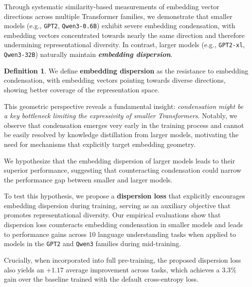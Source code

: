 \documentclass{article}
\theoremstyle{plain}
\theoremstyle{definition}
\newtheorem{definition}[theorem]{Definition}
\theoremstyle{remark}
\begin{document}
Through systematic similarity-based measurements of embedding vector directions across multiple Transformer families, we demonstrate that smaller models (e.g., \texttt{GPT2}, \texttt{Qwen3-0.6B}) exhibit severe embedding condensation, with embedding vectors concentrated towards nearly the same direction and therefore undermining representational diversity. In contrast, larger models (e.g., \texttt{GPT2-xl}, \texttt{Qwen3-32B}) naturally maintain \textit{\textbf{embedding dispersion}}. 

\vspace{-4pt}
\begin{tcolorbox}[
    colback=natureblue!10,
    boxrule=1pt,
    arc=8pt,
    left=4pt,
    right=4pt,
    top=0pt,
    bottom=0pt
]
\begin{definition}
\label{def:embedding_dispersion}
We define \textbf{embedding dispersion} as the resistance to embedding condensation, with embedding vectors pointing towards diverse directions, showing better coverage of the representation space.
\end{definition}
\end{tcolorbox}
\vspace{-4pt}

This geometric perspective reveals a fundamental insight: \textit{condensation might be a key bottleneck limiting the expressivity of smaller Transformers}. Notably, we observe that condensation emerges very early in the training process and cannot be easily resolved by knowledge distillation from larger models, motivating the need for mechanisms that explicitly target embedding geometry.

We hypothesize that the embedding dispersion of larger models leads to their superior performance, suggesting that counteracting condensation could narrow the performance gap between smaller and larger models.

To test this hypothesis, we propose a \textbf{dispersion loss} that explicitly encourages embedding dispersion during training, serving as an auxiliary objective that promotes representational diversity. Our empirical evaluations show that dispersion loss counteracts embedding condensation in smaller models and leads to performance gains across 10 language understanding tasks when applied to models in the \texttt{GPT2} and \texttt{Qwen3} families during mid-training.

Crucially, when incorporated into full pre-training, the proposed dispersion loss also yields an $+1.17$ average improvement across tasks, which achieves a $3.3\%$ gain over the baseline trained with the default cross-entropy loss.
\end{document}
